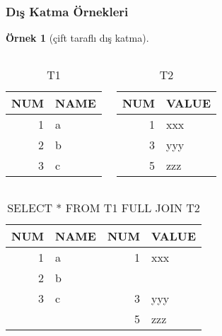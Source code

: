 \documentclass[dvipsnames]{beamer}
\theoremstyle{definition}
\theoremstyle{example}
\newtheorem{ornek}[theorem]{Örnek}
\theoremstyle{plain}
\begin{document}
\begin{frame}[fragile]
  \frametitle{Dış Katma Örnekleri}

  \begin{ornek}[çift taraflı dış katma]
    \begin{columns}[t]
      \begin{tiny}
      \begin{table}
        \caption{T1}
        \begin{tabular}{|r|l|}\hline
NUM & NAME\\\hline\hline
  1 & a   \\\hline
  2 & b   \\\hline
  3 & c   \\\hline
        \end{tabular}
      \end{table}
      \end{tiny}

      \begin{tiny}
      \begin{table}
        \caption{T2}
        \begin{tabular}{|r|l|}\hline
NUM & VALUE\\\hline\hline
  1 & xxx  \\\hline
  3 & yyy  \\\hline
  5 & zzz  \\\hline
        \end{tabular}
      \end{table}
      \end{tiny}
    \end{columns}

    \pause
    \begin{center}
      \begin{tiny}
      \begin{table}
        \caption{SELECT * FROM T1 FULL JOIN T2}
        \begin{tabular}{|r|l|r|l|}\hline
NUM & NAME & NUM & VALUE\\\hline\hline
  1 & a    &   1 & xxx  \\\hline
  2 & b    &     &      \\\hline
  3 & c    &   3 & yyy  \\\hline
    &      &   5 & zzz  \\\hline
        \end{tabular}
      \end{table}
      \end{tiny}
    \end{center}
  \end{ornek}
\end{frame}
\end{document}
